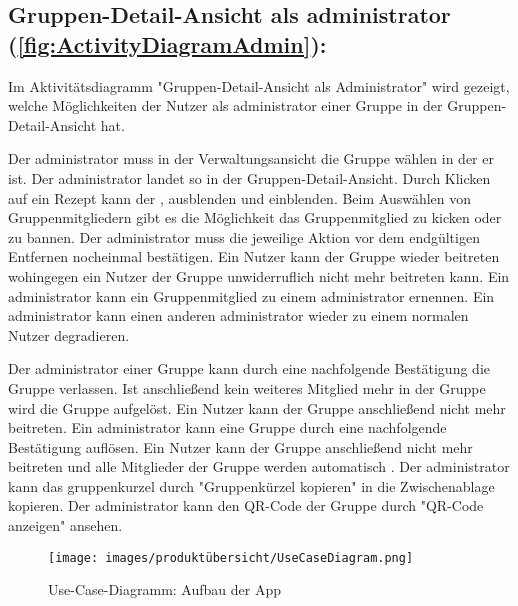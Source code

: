\documentclass[parskip=full]{scrartcl}
\begin{document}
\subsection{Gruppen-Detail-Ansicht als \gls{administrator} (\autoref{fig:ActivityDiagramAdmin}):}

Im Aktivitätsdiagramm "Gruppen-Detail-Ansicht als Administrator" wird gezeigt, welche Möglichkeiten der Nutzer als \gls{administrator} einer Gruppe in der Gruppen-Detail-Ansicht hat.

Der \gls{administrator} muss in der Verwaltungsansicht die Gruppe wählen in der er  ist.
Der \gls{administrator} landet so in der Gruppen-Detail-Ansicht.
Durch Klicken auf ein Rezept kann der ,   \gls{ausblenden} und   \gls{einblenden}.\newline
Beim Auswählen von Gruppenmitgliedern gibt es die Möglichkeit das Gruppenmitglied zu \gls{kicken} oder zu \gls{bannen}.
Der \gls{administrator} muss die jeweilige Aktion vor dem endgültigen Entfernen nocheinmal bestätigen.
Ein  Nutzer kann der Gruppe wieder beitreten wohingegen ein  Nutzer der Gruppe unwiderruflich nicht mehr beitreten kann.
Ein \gls{administrator} kann ein Gruppenmitglied zu einem \gls{administrator} ernennen.
Ein \gls{administrator} kann einen anderen \gls{administrator} wieder zu einem normalen Nutzer degradieren.

Der \gls{administrator} einer Gruppe kann durch eine nachfolgende Bestätigung die Gruppe verlassen.
Ist anschließend kein weiteres Mitglied mehr in der Gruppe wird die Gruppe aufgelöst. Ein Nutzer kann der Gruppe anschließend nicht mehr beitreten.
Ein \gls{administrator} kann eine Gruppe durch eine nachfolgende Bestätigung auflösen. Ein Nutzer kann der Gruppe anschließend nicht mehr beitreten und alle Mitglieder der Gruppe werden automatisch .\newline
Der \gls{administrator} kann das \gls{gruppenkurzel} durch "Gruppenkürzel kopieren" in die Zwischenablage kopieren. Der \gls{administrator} kann den QR-Code der Gruppe durch "QR-Code anzeigen" ansehen.

\newpage

\begin{figure}[!htp]
    \centering
    \begin{adjustbox}{right=160mm}
        \texttt{[image: images/produktübersicht/UseCaseDiagram.png]}
    \end{adjustbox}
    \caption{Use-Case-Diagramm: Aufbau der App}
    \label{fig:UseCaseDiagram}
\end{figure}
\newpage
\end{document}
